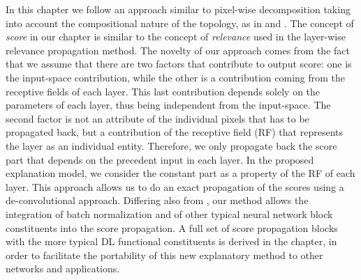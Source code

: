 In this chapter we follow an approach similar to pixel-wise decomposition taking into account the compositional nature of the topology, as in \citep{zeiler2014visualizing} and \citep{bach2015pixel}. The concept of \emph{score} in our chapter is similar to the concept of \emph{relevance} used in the layer-wise relevance propagation method. The novelty of our approach comes from the fact that we assume that there are two factors that contribute to output score: one is the input-space contribution, while the other is a contribution coming from the receptive fields of each layer. This last contribution depends solely on the parameters of each layer, thus being independent from the input-space. The second factor is not an attribute of the individual pixels that has to be propagated back, but a contribution of the receptive field (RF) that represents the layer as an individual entity. Therefore, we only propagate back the score part that depends on the precedent input in each layer. In the proposed explanation model, we consider the constant part as a property of the RF of each layer. This approach allows us to do an exact propagation of the scores using a de-convolutional approach. Differing also from \citep{zeiler2014visualizing}, our method allows the integration of batch normalization and of other typical neural network block constituents into the score propagation. A full set of score propagation blocks with the more typical DL functional constituents is derived in the chapter, in order to facilitate the portability of this new explanatory method to other networks and applications.


